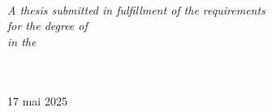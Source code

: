 \documentclass[
  letterpaper,
  oneside,
  openany]{MastersDoctoralThesis}
\begin{document}
{\begin{titlepage}
\begin{center}
\begin{minipage}[t]{0.4\textwidth}
\begin{flushright}
    \end{flushright}
    \end{minipage}\\[3cm]
     
    \vfill
    
    \large \textit{A thesis submitted in fulfillment of the requirements\\ for the degree of \degreename}\\[0.3cm] %
    \textit{in the}\\[0.4cm]
    \groupname\\
    \deptname\\[2cm] %
     
    \vfill
    
        
        {\large 17 mai 2025}\\[4cm] %
        
    \vfill
    \end{center}
    \end{titlepage}
  }
\else
\end{document}
